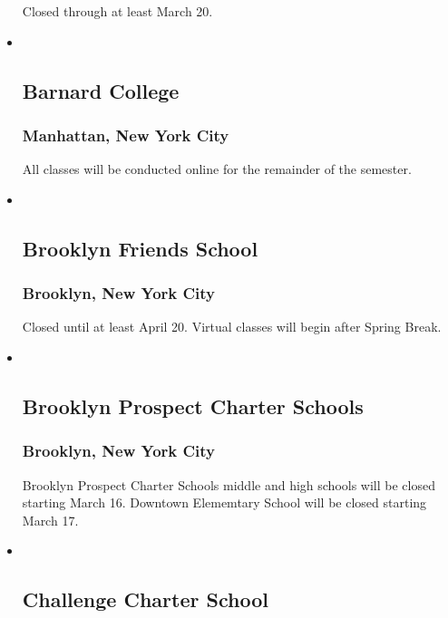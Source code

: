 \begin{itemize}
  Closed through at least March 20.
\item ~
  \hypertarget{barnard-college}{%
  \subsection{Barnard College}\label{barnard-college}}

  \hypertarget{manhattan-new-york-city}{%
  \subsubsection{Manhattan, New York
  City}\label{manhattan-new-york-city}}

  All classes will be conducted online for the remainder of the
  semester.
\item ~
  \hypertarget{brooklyn-friends-school}{%
  \subsection{Brooklyn Friends School}\label{brooklyn-friends-school}}

  \hypertarget{brooklyn-new-york-city}{%
  \subsubsection{Brooklyn, New York City}\label{brooklyn-new-york-city}}

  Closed until at least April 20. Virtual classes will begin after
  Spring Break.
\item ~
  \hypertarget{brooklyn-prospect-charter-schools}{%
  \subsection{Brooklyn Prospect Charter
  Schools}\label{brooklyn-prospect-charter-schools}}

  \hypertarget{brooklyn-new-york-city-1}{%
  \subsubsection{Brooklyn, New York
  City}\label{brooklyn-new-york-city-1}}

  Brooklyn Prospect Charter Schools middle and high schools will be
  closed starting March 16. Downtown Elememtary School will be closed
  starting March 17.
\item ~
  \hypertarget{challenge-charter-school}{%
  \subsection{Challenge Charter School}\label{challenge-charter-school}}


\end{itemize}
